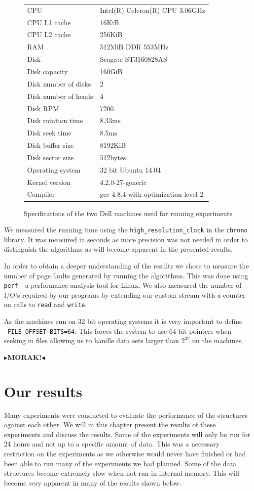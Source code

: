 \documentclass[twoside,11pt,openright]{report}
\newcommand{\todo}[1]{{\color[rgb]{.5,0,0}\textbf{$\blacktriangleright$#1$\blacktriangleleft$}}}
\begin{document}
\begin{figure}[h]
\centering
\begin{tabular}{ll}
CPU & Intel(R) Celeron(R) CPU 3.06GHz \\
CPU L1 cache & 16KiB \\
CPU L2 cache & 256KiB \\
RAM & 512MiB DDR 553MHz \\
Disk & Seagate ST3160828AS \\
Disk capacity & 160GiB \\
Disk number of disks & 2 \\
Disk number of heads & 4 \\
Disk RPM & 7200 \\
Disk rotation time & 8.33ms \\
Disk seek time & 8.5ms \\
Disk buffer size & 8192KiB \\
Disk sector size & 512bytes \\
Operating system & 32 bit Ubuntu 14.04 \\
Kernel version & 4.2.0-27-generic \\
Compiler & gcc 4.8.4 with optimization level 2
\end{tabular}
\caption{Specifications of the two Dell machines used for running experiments}
\label{fig:pc_specs}
\end{figure}

We measured the running time using the \texttt{high\_resolution\_clock} in the \texttt{chrono} library. It was measured in seconds as more precision was not needed in order to distinguish the algorithms as will become apparent in the presented results.

In order to obtain a deeper understanding of the results we chose to measure the number of page faults generated by running the algorithms. This was done using \texttt{perf} - a performance analysis tool for Linux. We also measured the number of I/O's required by our programs by extending our custom stream with a counter on calls to \texttt{read} and \texttt{write}.

As the machines run on 32 bit operating systems it is very important to define \texttt{\_FILE\_OFFSET\_BITS=64}. This forces the system to use 64 bit pointers when seeking in files allowing us to handle data sets larger than $2^{32}$ on the machines.

\todo{MORAK!}

\chapter{Our results}
\label{chp:experimental_results}
Many experiments were conducted to evaluate the performance of the structures against each other. We will in this chapter present the results of these experiments and discuss the results.
Some of the experiments will only be run for 24 hours and not up to a specific amount of data. This was a necessary restriction on the experiments as we otherwise would never have finished or had been able to run many of the experiments we had planned. Some of the data structures become extremely slow when not run in internal memory. This will become very apparent in many of the results shown below.
\end{document}

